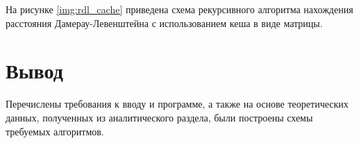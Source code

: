 \newpage

На рисунке \ref{img:rdl_cache} приведена схема рекурсивного алгоритма нахождения расстояния Дамерау-Левенштейна с использованием кеша в виде матрицы.


\newpage

\section*{Вывод}

Перечислены требования к вводу и программе, а также на основе теоретических данных, полученных из аналитического раздела, были построены схемы требуемых алгоритмов.







